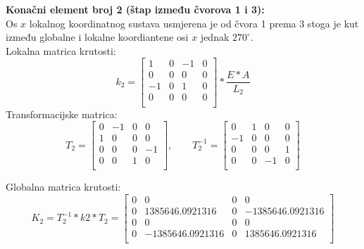 \documentclass[a4paper,twoside,12pt]{memoir} %
\begin{document}
\textbf{Konačni element broj 2 (štap između čvorova 1 i 3):} \\
Os $x$ lokalnog koordinatnog sustava usmjerena je od čvora 1 prema 3 stoga je kut između globalne i lokalne koordiantene osi $x$ jednak $270^\circ$. \\
Lokalna matrica krutosti:
\begin{equation}
    k_2 = 
    \begin{bmatrix}
    1 & 0 & -1 & 0 \\
    0 & 0 & 0 & 0 \\
    -1 & 0 & 1 & 0 \\
    0 & 0 & 0 & 0 \\
    \end{bmatrix} * \frac{E * A}{L_2}
\end{equation}
Transformacijske matrica:
\begin{equation}
    T_2 =
    \begin{bmatrix}
    0 & -1 & 0 & 0 \\
    1 & 0 & 0 & 0 \\
    0 & 0 & 0 & -1 \\
    0 & 0 & 1 & 0 \\
    \end{bmatrix}, \qquad
    T^{-1}_2 =
    \begin{bmatrix}
    0 & 1 & 0 & 0 \\
    -1 & 0 & 0 & 0 \\
    0 & 0 & 0 & 1 \\
    0 & 0 & -1 & 0 \\
    \end{bmatrix}
\end{equation}

Globalna matrica krutosti:
\begin{equation}
    K_2 = T^{-1}_2 * k2 * T_2 =
    \begin{bmatrix}
    0 & 0 & 0 & 0 \\
    0 & 1385646.0921316 & 0 & -1385646.0921316 \\
    0 & 0 & 0 & 0 \\
    0 & -1385646.0921316 & 0 & 1385646.0921316 \\
    \end{bmatrix}
\end{equation}
\end{document}
